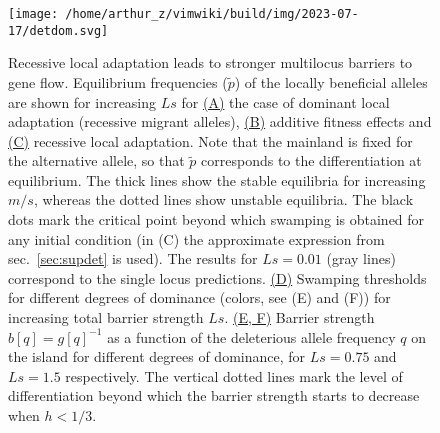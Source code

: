 \documentclass[
  11pt,
]{article}
\begin{document}
\begin{figure}
\hypertarget{fig:detdom}{%
\centering
\texttt{[image: /home/arthur\_z/vimwiki/build/img/2023-07-17/detdom.svg]}
\caption{Recessive local adaptation leads to stronger multilocus
barriers to gene flow. Equilibrium frequencies (\(\tilde{p}\)) of the
locally beneficial alleles are shown for increasing \(Ls\) for
\uline{(A)} the case of dominant local adaptation (recessive migrant
alleles), \uline{(B)} additive fitness effects and \uline{(C)} recessive
local adaptation. Note that the mainland is fixed for the alternative
allele, so that \(\tilde{p}\) corresponds to the differentiation at
equilibrium. The thick lines show the stable equilibria for increasing
\(m/s\), whereas the dotted lines show unstable equilibria. The black
dots mark the critical point beyond which swamping is obtained for any
initial condition (in (C) the approximate expression from
sec.~\ref{sec:supdet} is used). The results for \(Ls=0.01\) (gray lines)
correspond to the single locus predictions. \uline{(D)} Swamping
thresholds for different degrees of dominance (colors, see (E) and (F))
for increasing total barrier strength \(Ls\). \uline{(E, F)} Barrier
strength \(b[q] = g[q]^{-1}\) as a function of the deleterious allele
frequency \(q\) on the island for different degrees of dominance, for
\(Ls=0.75\) and \(Ls=1.5\) respectively. The vertical dotted lines mark
the level of differentiation beyond which the barrier strength starts to
decrease when \(h < 1/3\).}\label{fig:detdom}
}
\end{figure}
\end{document}
